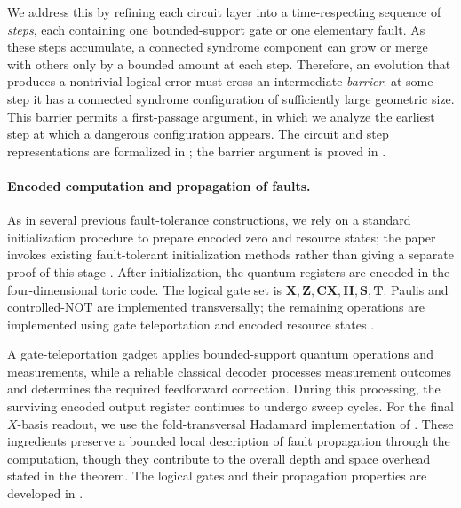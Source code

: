We address this by refining each circuit layer into a time-respecting sequence of \emph{steps}, each containing one bounded-support gate or one elementary fault.  As these steps accumulate, a connected syndrome component can grow or merge with others only by a bounded amount at each step.  Therefore, an evolution that produces a nontrivial logical error must cross an intermediate \emph{barrier}: at some step it has a connected syndrome configuration of sufficiently large geometric size.  This barrier permits a first-passage argument, in which we analyze the earliest step at which a dangerous configuration appears.  The circuit and step representations are formalized in ; the barrier argument is proved in .



\paragraph{Encoded computation and propagation of faults.}
As in several previous fault-tolerance constructions, we rely on a standard initialization procedure to prepare encoded zero and resource states; the paper invokes existing fault-tolerant initialization methods rather than giving a separate proof of this stage \cite{aharonov1999faulttolerant,grospellier:tel-03364419,gottesman2014faulttolerant}.  After initialization, the quantum registers are encoded in the four-dimensional toric code.  The logical gate set is $\mathbf X,\mathbf Z,\mathbf{CX},\mathbf H,\mathbf S,\mathbf T$.  Paulis and controlled-NOT are implemented transversally; the remaining operations are implemented using gate teleportation and encoded resource states \cite{Zhou_2000}.

A gate-teleportation gadget applies bounded-support quantum operations and measurements, while a reliable classical decoder processes measurement outcomes and determines the required feedforward correction.  During this processing, the surviving encoded output register continues to undergo sweep cycles.  For the final $X$-basis readout, we use the fold-transversal Hadamard implementation of \cite{Breuckmann_2024}.  These ingredients preserve a bounded local description of fault propagation through the computation, though they contribute to the overall depth and space overhead stated in the theorem.  The logical gates and their propagation properties are developed in .

